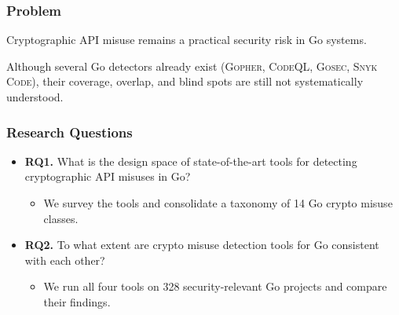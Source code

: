 \documentclass[10pt]{beamer}
\newcommand{\CodeQL}{\textsc{CodeQL}\xspace}
\newcommand{\Gopher}{\textsc{Gopher}\xspace}
\newcommand{\Gosec}{\textsc{Gosec}\xspace}
\newcommand{\SnykCode}{\textsc{Snyk Code}\xspace}
\begin{document}
\begin{frame}
    \frametitle{Problem}
    Cryptographic API misuse remains a practical security risk in Go systems.

    \vspace{0.8em}

    Although several Go detectors already exist (\Gopher, \CodeQL, \Gosec, \SnykCode), their coverage, overlap, and blind spots are still not systematically understood.
\end{frame}




\begin{frame}
    \frametitle{Research Questions}
    \begin{itemize}
        \setlength{\itemsep}{0.7em}
        \item \textbf{RQ1.} What is the design space of state-of-the-art tools for detecting cryptographic API misuses in Go?
        \begin{itemize}
            \item We survey the tools and consolidate a taxonomy of 14 Go crypto misuse classes.
        \end{itemize}
        \vspace{0.5em}
        \item \textbf{RQ2.} To what extent are crypto misuse detection tools for Go consistent with each other?
        \begin{itemize}
            \item We run all four tools on 328 security-relevant Go projects and compare their findings.
        \end{itemize}
    \end{itemize}
\end{frame}
\end{document}
